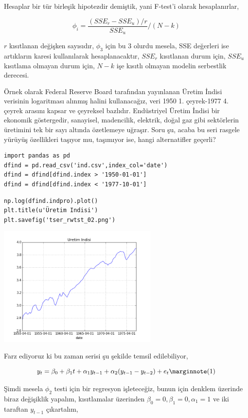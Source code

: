 \documentclass[12pt,fleqn]{article}\usepackage{../../common}
\begin{document}
Hesaplar bir tür birleşik hipotezdir demiştik, yani F-test'i olarak
hesaplanırlar,

$$ \phi_i = \frac{(SSE_r - SSE_u) / r}{SSE_u} / (N-k) $$

$r$ kısıtlanan değişken sayısıdır, $\phi_3$ için bu 3 olurdu mesela, SSE
değerleri ise artıkların karesi kullanılarak hesaplanacaktır, $SSE_r$
kısıtlanan durum için, $SSE_u$ kısıtlama olmayan durum için, $N-k$ işe
kısıtlı olmayan modelin serbestlik derecesi.

Örnek olarak Federal Reserve Board tarafından yayınlanan Üretim İndisi
verisinin logaritması alınmış halini kullanacağız, veri 1950 1. çeyrek-1977
4. çeyrek arasını kapsar ve çeyreksel bazlıdır. Endüstriyel Üretim İndisi
bir ekonomik göstergedir, sanayisel, madencilik, elektrik, doğal gaz gibi
sektörlerin üretimini tek bir sayı altında özetlemeye uğraşır. Soru şu,
acaba bu seri rasgele yürüyüş özellikleri taşıyor mu, taşımıyor ise, hangi
alternatifler geçerli? 

\begin{verbatim}
import pandas as pd
dfind = pd.read_csv('ind.csv',index_col='date')
dfind = dfind[dfind.index > '1950-01-01']
dfind = dfind[dfind.index < '1977-10-01']
\end{verbatim}

\begin{verbatim}
np.log(dfind.indpro).plot()
plt.title(u'Üretim Indisi')
plt.savefig('tser_rwtst_02.png')
\end{verbatim}

\includegraphics[height=6cm]{tser_rwtst_02.png}

Farz ediyoruz ki bu zaman serisi şu şekilde temsil edilebiliyor,

$$ 
y_t = \beta_0 + \beta_1 t + \alpha_1 y_{t-1} + \alpha_2 (y_{t-1} - y_{t-2}) + e_t 
\mlabel{1}
$$

Şimdi mesela $\phi_2$ testi için bir regresyon işleteceğiz, bunun için
denklem üzerinde biraz değişiklik yapalım, kısıtlamalar üzerinden
$\beta_0=0,\beta_1=0,\alpha_1=1$ ve iki taraftan $y_{t-1}$ çıkartalım,
\end{document}
